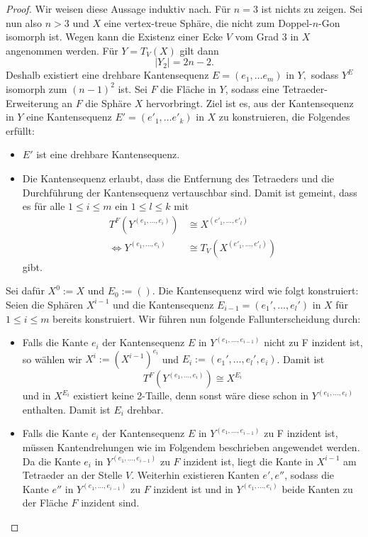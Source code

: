 \documentclass[12pt,titlepage,twoside,cleardoublepage]{article}
\theoremstyle{nummermitklammern}
\numberwithin{equation}{section}
\begin{document}
\begin{proof}
Wir weisen diese Aussage induktiv nach. Für $n=3$ ist nichts zu zeigen. Sei nun also $n>3$ und $X$ eine vertex-treue Sphäre, die nicht zum Doppel-$n$-Gon isomorph ist. 
Wegen  kann die Existenz einer Ecke $V$ vom Grad 3 in $X$ angenommen werden. Für $Y=T_V(X)$ gilt dann 
\[
\vert Y_2\vert=2n-2.
\]
Deshalb existiert eine drehbare Kantensequenz $E=(e_1,\ldots e_m)$ in $Y,$ sodass $Y^E$ isomorph zum $(n-1)^2$ ist. Sei $F$ die Fläche in $Y$, sodass eine Tetraeder-Erweiterung an $F$ die Sphäre $X$ hervorbringt. Ziel ist es, aus der Kantensequenz in $Y$ eine Kantensequenz $E'=(e'_1,\ldots e'_k)$ in $X$ zu konstruieren, die Folgendes erfüllt:
\begin{itemize}
\item $E'$ ist eine drehbare Kantensequenz.
\item Die Kantensequenz erlaubt, dass die Entfernung des Tetraeders und die Durchführung der Kantensequenz vertauschbar sind. Damit ist gemeint, dass es für alle $1\leq i\leq m$ ein $1\leq l \leq k$ mit 
\begin{align*}
T^F(Y^{(e_1,\ldots, e_i)})&\cong X^{(e'_1,\ldots,e'_l)} \\
\Leftrightarrow Y^{(e_1,\ldots, e_i)}&\cong T_V(X^{(e'_1,\ldots,e'_l)})
\end{align*} 
gibt.
\end{itemize}
Sei dafür $X^0:=X$ und $E_0:=().$ Die Kantensequenz wird wie folgt konstruiert: Seien die Sphären $X^{i-1}$ und die Kantensequenz $E_{i-1}=(e_1',\ldots,e_l')$ in $X$ für $1\leq i \leq m$ bereits konstruiert. Wir führen nun folgende Fallunterscheidung durch:
\begin{itemize}
\item Falls die Kante $e_{i}$ der Kantensequenz $E$ in $Y^{(e_1,\ldots,e_{i-1})}$ nicht zu F inzident ist, so wählen wir $X^{i}:={(X^{i-1})}^{e_i}$ und $E_{i}:=(e_1',\ldots,e_l',e_i)$. Damit ist 
\[
T^F(Y^{(e_1,\ldots,e_i)})\cong X^{E_{i}}
\]
und in $X^{E_{i}}$ existiert keine 2-Taille, denn sonst wäre diese schon in $Y^{(e_1,\ldots,e_i)}$ enthalten. Damit ist $E_{i}$ drehbar.
\item Falls die Kante $e_i$ der Kantensequenz $E$ in $Y^{(e_1,\ldots,e_{i-1})}$ zu F inzident ist, müssen Kantendrehungen wie im Folgendem beschrieben angewendet werden. Da die Kante $e_i$ in $Y^{(e_1,\ldots,e_{i-1})}$ zu $F$ inzident ist, liegt die Kante in $X^{i-1}$ am Tetraeder an der Stelle $V.$
Weiterhin existieren Kanten $e',e''$, sodass die Kante $e''$ in $Y^{(e_1,\ldots,e_{i-1})}$ zu $F$ inzident ist und in $Y^{(e_1,\ldots,e_{i})}$ beide Kanten zu der Fläche $F$ inzident sind.

\end{itemize}
\end{proof}
\end{document}
